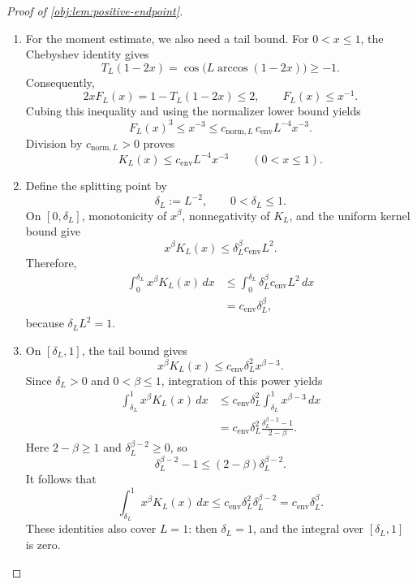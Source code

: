 \documentclass[11pt]{article}
\begin{document}
\begin{proof}[Proof of \cref{obj:lem:positive-endpoint}]
\begin{enumerate}
\item For the moment estimate, we also need a tail bound. For \(0<x\le1\), the Chebyshev identity gives
\[
T_L(1-2x)
=
\cos\!\bigl(L\arccos(1-2x)\bigr)
\ge-1.
\]
Consequently,
\[
2xF_L(x)=1-T_L(1-2x)\le2,
\qquad
F_L(x)\le x^{-1}.
\]
Cubing this inequality and using the normalizer lower bound yields
\[
F_L(x)^3
\le x^{-3}
\le c_{\mathrm{norm},L}\,c_{\mathrm{env}}L^{-4}x^{-3}.
\]
Division by \(c_{\mathrm{norm},L}>0\) proves
\[
K_L(x)\le c_{\mathrm{env}}L^{-4}x^{-3}
\qquad(0<x\le1).
\]

\item Define the splitting point by
\[
\delta_L:=L^{-2},
\qquad
0<\delta_L\le1.
\]
On \([0,\delta_L]\), monotonicity of \(x^\beta\), nonnegativity of \(K_L\), and the uniform kernel bound give
\[
x^\beta K_L(x)
\le
\delta_L^\beta c_{\mathrm{env}}L^2.
\]
Therefore,
\[
\begin{aligned}
\int_0^{\delta_L}x^\beta K_L(x)\,dx
&\le
\int_0^{\delta_L}
\delta_L^\beta c_{\mathrm{env}}L^2\,dx\\
&=
c_{\mathrm{env}}\delta_L^\beta,
\end{aligned}
\]
because \(\delta_LL^2=1\).

\item On \([\delta_L,1]\), the tail bound gives
\[
x^\beta K_L(x)
\le
c_{\mathrm{env}}\delta_L^2x^{\beta-3}.
\]
Since \(\delta_L>0\) and \(0<\beta\le1\), integration of this power yields
\[
\begin{aligned}
\int_{\delta_L}^1x^\beta K_L(x)\,dx
&\le
c_{\mathrm{env}}\delta_L^2
\int_{\delta_L}^1x^{\beta-3}\,dx\\
&=
c_{\mathrm{env}}\delta_L^2
\frac{\delta_L^{\beta-2}-1}{2-\beta}.
\end{aligned}
\]
Here \(2-\beta\ge1\) and \(\delta_L^{\beta-2}\ge0\), so
\[
\delta_L^{\beta-2}-1
\le
(2-\beta)\delta_L^{\beta-2}.
\]
It follows that
\[
\int_{\delta_L}^1x^\beta K_L(x)\,dx
\le
c_{\mathrm{env}}\delta_L^2\delta_L^{\beta-2}
=
c_{\mathrm{env}}\delta_L^\beta.
\]
These identities also cover \(L=1\): then \(\delta_L=1\), and the integral over \([\delta_L,1]\) is zero.


\end{enumerate}
\end{proof}
\end{document}
